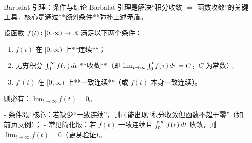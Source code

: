 \begin{frame}{Barbalat 引理：条件与结论}
  Barbalat 引理是解决“积分收敛 $\Rightarrow$ 函数收敛”的关键工具，核心是通过**额外条件**弥补上述矛盾。

  \vspace{0.5cm}
  \begin{theorem}[经典 Barbalat 引理]
    设函数 $f(t): [0, \infty) \to \mathbb{R}$ 满足以下两个条件：
    \begin{enumerate}
      \item $f(t)$ 在 $[0, \infty)$ 上**连续**；
      \item 无穷积分 $\int_{0}^{\infty} f(\tau) \, dt$ **收敛**（即 $\lim_{t \to \infty} \int_{0}^{t} f(\tau) \, d\tau = C$，$C$ 为常数）；
      \item $f'(t)$ 在 $[0, \infty)$ 上**一致连续**（或 $f(t)$ 本身一致连续）。
    \end{enumerate}
    则必有：$\boxed{\lim_{t \to \infty} f(t) = 0}$。
  \end{theorem}

  \vspace{0.3cm}
  \begin{remark}
    - 条件3是核心：若缺少“一致连续”，则可能出现“积分收敛但函数不趋于零”（如前页反例）；
    - 常见简化版：若 $f(t)$ 一致连续且 $\int_{0}^{\infty} f(\tau) \, dt$ 收敛，则 $\lim_{t \to \infty} f(t) = 0$（更易验证）。
  \end{remark}
\end{frame}

